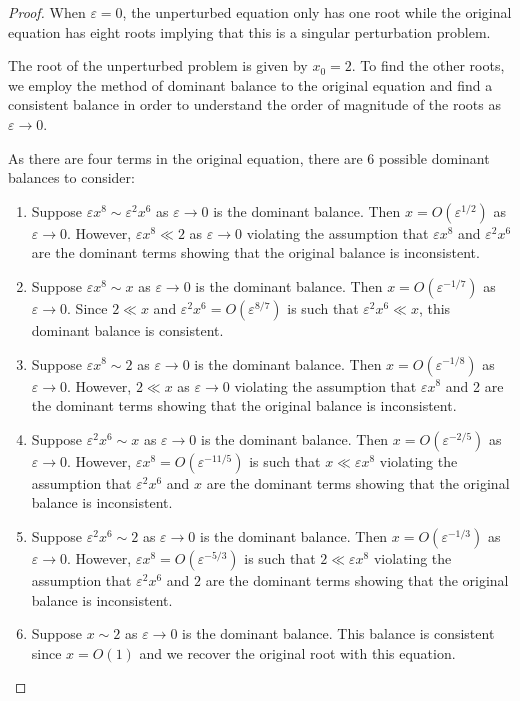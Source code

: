 \documentclass[12pt]{article}
\theoremstyle{definition}
\begin{document}
\begin{proof}
  When $\varepsilon = 0$, the unperturbed equation only has one root while
  the original equation has eight roots implying that this is a singular perturbation problem.

  The root of the unperturbed problem is given by $x_0 = 2$. To find the other
  roots, we employ the method of dominant balance to the original equation and
  find a consistent balance in order to understand the order of magnitude of the roots
  as $\varepsilon \to 0$.

  As there are four terms in the original equation, there are 6
  possible dominant balances to consider:
  \begin{enumerate}[label=\roman*.]
    \item Suppose $\varepsilon x^8 \sim \varepsilon^2 x^6$ as $\varepsilon \to 0$ is the dominant balance.
      Then $x=O(\varepsilon^{1/2})$ as $\varepsilon \to 0$. However, $\varepsilon x^8 \ll 2$ as $\varepsilon \to 0$ violating the assumption
      that $\varepsilon x^8$ and $\varepsilon^2 x^6$ are the dominant terms showing that the original balance is inconsistent.
    \item Suppose $\varepsilon x^8 \sim x$ as $\varepsilon \to 0$ is the dominant balance.
      Then $x=O(\varepsilon^{-1/7})$ as $\varepsilon \to 0$. Since $2 \ll x$ and $\varepsilon^2 x^6 = O(\varepsilon^{8/7})$ is such that
      $\varepsilon^2 x^6 \ll x$, this dominant balance is consistent.
    \item Suppose $\varepsilon x^8 \sim 2$ as $\varepsilon \to 0$ is the dominant balance. Then $x=O(\varepsilon^{-1/8})$  as $\varepsilon \to 0$. However,
      $2 \ll x$ as $\varepsilon \to 0$ violating the assumption that $\varepsilon x^8$ and 2 are the dominant
      terms showing that the original balance is inconsistent.
    \item Suppose $\varepsilon^2 x^6 \sim x$ as $\varepsilon \to 0$ is the dominant balance. Then $x=O(\varepsilon^{-2/5})$  as $\varepsilon \to 0$.
      However, $\varepsilon x^8 = O(\varepsilon^{-11/5})$ is such that $x \ll \varepsilon x^8$ violating the assumption that $\varepsilon^2 x^6$ and $x$ are
      the dominant terms showing that the original balance is inconsistent.
    \item Suppose $\varepsilon^2 x^6 \sim 2$ as $\varepsilon \to 0$ is the dominant balance. Then $x=O(\varepsilon^{-1/3})$ as $\varepsilon \to 0$.
      However, $\varepsilon x^8 = O(\varepsilon^{-5/3})$ is such that $2 \ll \varepsilon x^8$ violating the assumption that $\varepsilon^2 x^6$ and $2$ are
      the dominant terms showing that the original balance is inconsistent.
    \item Suppose $x \sim 2$ as $\varepsilon \to 0$ is the dominant balance. This balance is consistent since $x=O(1)$ and we recover the original root with this equation.
  \end{enumerate}


\end{proof}
\end{document}
